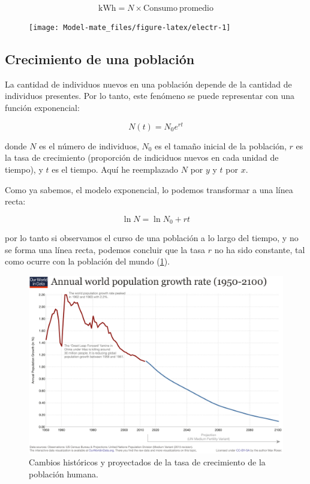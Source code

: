 \documentclass[
]{book}
\begin{document}
\[\mathrm{kWh} = N \times \mathrm{Consumo\ promedio} \]

\begin{figure}

{\centering \texttt{[image: Model-mate\_files/figure-latex/electr-1]} 

}

\end{figure}

\hypertarget{crecimiento-de-una-poblaciuxf3n}{%
\subsection{Crecimiento de una población}\label{crecimiento-de-una-poblaciuxf3n}}

La cantidad de individuos nuevos en una población depende de la cantidad de individuos presentes. Por lo tanto, este fenómeno se puede representar con una función exponencial:

\begin{equation}
N(t) = N_0e^{rt} \label{eq:crec-pobl}
\end{equation}

donde \(N\) es el número de individuos, \(N_0\) es el tamaño inicial de la población, \(r\) es la tasa de crecimiento (proporción de indiciduos nuevos en cada unidad de tiempo), y \(t\) es el tiempo. Aquí he reemplazado \(N\) por \(y\) y \(t\) por \(x\).

Como ya sabemos, el modelo exponencial, lo podemos transformar a una línea recta:

\[ \ln N = \ln N_0 + rt\]

por lo tanto si observamos el curso de una población a lo largo del tiempo, y no se forma una línea recta, podemos concluir que la tasa \(r\) no ha sido constante, tal como ocurre con la población del mundo (\ref{fig:tasa-crec}).

\begin{figure}

{\centering \includegraphics{Unidad-I/Tasa-crec} 

}

\caption{Cambios históricos y proyectados de la tasa de crecimiento de la población humana.}\label{fig:tasa-crec}
\end{figure}
\end{document}
